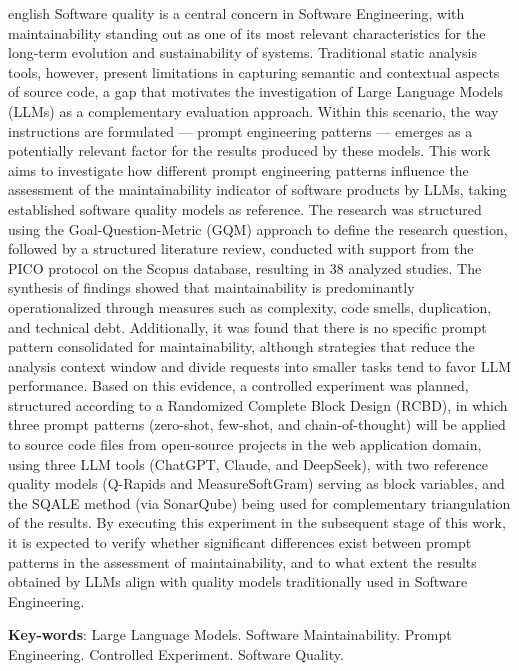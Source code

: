 \begin{resumo}[Abstract]
  \begin{otherlanguage*}{english}
    Software quality is a central concern in Software Engineering, with maintainability standing out as one of its most relevant characteristics for the long-term evolution and sustainability of systems. Traditional static analysis tools, however, present limitations in capturing semantic and contextual aspects of source code, a gap that motivates the investigation of Large Language Models (LLMs) as a complementary evaluation approach. Within this scenario, the way instructions are formulated — prompt engineering patterns — emerges as a potentially relevant factor for the results produced by these models. This work aims to investigate how different prompt engineering patterns influence the assessment of the maintainability indicator of software products by LLMs, taking established software quality models as reference. The research was structured using the Goal-Question-Metric (GQM) approach to define the research question, followed by a structured literature review, conducted with support from the PICO protocol on the Scopus database, resulting in 38 analyzed studies. The synthesis of findings showed that maintainability is predominantly operationalized through measures such as complexity, code smells, duplication, and technical debt. Additionally, it was found that there is no specific prompt pattern consolidated for maintainability, although strategies that reduce the analysis context window and divide requests into smaller tasks tend to favor LLM performance. Based on this evidence, a controlled experiment was planned, structured according to a Randomized Complete Block Design (RCBD), in which three prompt patterns (zero-shot, few-shot, and chain-of-thought) will be applied to source code files from open-source projects in the web application domain, using three LLM tools (ChatGPT, Claude, and DeepSeek), with two reference quality models (Q-Rapids and MeasureSoftGram) serving as block variables, and the SQALE method (via SonarQube) being used for complementary triangulation of the results. By executing this experiment in the subsequent stage of this work, it is expected to verify whether significant differences exist between prompt patterns in the assessment of maintainability, and to what extent the results obtained by LLMs align with quality models traditionally used in Software Engineering.

    \vspace{\onelineskip}
  
    \noindent 
    \textbf{Key-words}: Large Language Models. Software Maintainability. Prompt Engineering. Controlled Experiment. Software Quality.
  \end{otherlanguage*}
\end{resumo}
